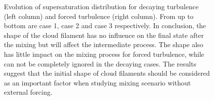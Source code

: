 \begin{figure}[H]\ContinuedFloat
{}
\caption{Evolution of supersaturation distribution for decaying turbulence
(left column) and forced turbulence (right column). From up to bottom are case
1, case 2 and case 3 respectively. In conclusion, the shape of the cloud
filament has no influence on the final state after the mixing but will affect
the intermediate process. The shape also has little impact on the mixing
process for forced turbulence, while can not be completely ignored in the
decaying cases. The results suggest that the initial shape of cloud filaments
should be considered as an important factor when studying mixing scenario
without external forcing.}\label{fig:supersat_distri} \end{figure}


